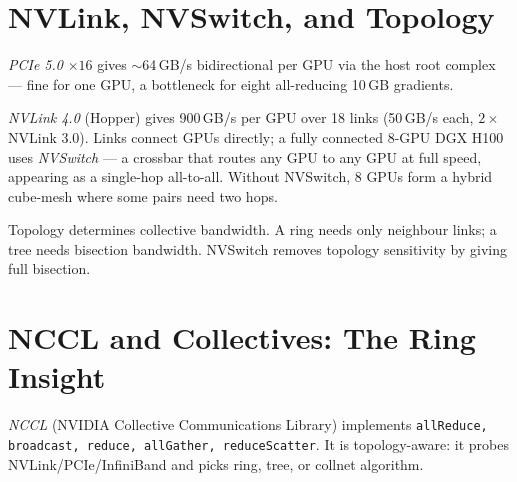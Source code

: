 \section{NVLink, NVSwitch, and Topology}
\emph{PCIe 5.0} $\times16$ gives $\sim$64\,GB/s bidirectional per GPU via the host root complex --- fine for one GPU, a bottleneck for eight all-reducing 10\,GB gradients.

\emph{NVLink 4.0} (Hopper) gives 900\,GB/s per GPU over 18 links (50\,GB/s each, $2\times$ NVLink 3.0). Links connect GPUs directly; a fully connected 8-GPU DGX H100 uses \emph{NVSwitch} --- a crossbar that routes any GPU to any GPU at full speed, appearing as a single-hop all-to-all. Without NVSwitch, 8 GPUs form a hybrid cube-mesh where some pairs need two hops.

Topology determines collective bandwidth. A ring needs only neighbour links; a tree needs bisection bandwidth. NVSwitch removes topology sensitivity by giving full bisection.

\begin{center}
\end{center}

\section{NCCL and Collectives: The Ring Insight}
\emph{NCCL} (NVIDIA Collective Communications Library) implements \texttt{allReduce, broadcast, reduce, allGather, reduceScatter}. It is topology-aware: it probes NVLink/PCIe/InfiniBand and picks ring, tree, or collnet algorithm.

